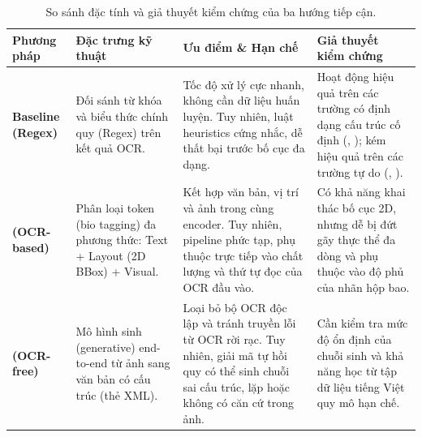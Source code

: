 \begin{table}[htbp]
  \centering
  \caption{So sánh đặc tính và giả thuyết kiểm chứng của ba hướng tiếp cận.}
  \label{tab:method-comparison}
  \small
  \begin{tabularx}{\textwidth}{p{2.3cm} p{2.4cm} L{3.2cm} X}
    \toprule
    \textbf{Phương pháp} & \textbf{Đặc trưng kỹ thuật} & \textbf{Ưu điểm \& Hạn chế} & \textbf{Giả thuyết kiểm chứng} \\
    \midrule
    \textbf{Baseline (Regex)} 
      & Đối sánh từ khóa và biểu thức chính quy (Regex) trên kết quả OCR. 
      & Tốc độ xử lý cực nhanh, không cần dữ liệu huấn luyện. Tuy nhiên, luật heuristics cứng nhắc, dễ thất bại trước bố cục đa dạng.
      & Hoạt động hiệu quả trên các trường có định dạng cấu trúc cố định (, ); kém hiệu quả trên các trường tự do (, ). \\
    \addlinespace
    \textbf{ (OCR-based)}
      & Phân loại token (\gls{bio} tagging) đa phương thức: Text + Layout (2D BBox) + Visual.
      & Kết hợp văn bản, vị trí và ảnh trong cùng encoder. Tuy nhiên, pipeline phức tạp, phụ thuộc trực tiếp vào chất lượng và thứ tự đọc của OCR đầu vào.
      & Có khả năng khai thác bố cục 2D, nhưng dễ bị đứt gãy thực thể đa dòng và phụ thuộc vào độ phủ của nhãn hộp bao. \\
    \addlinespace
    \textbf{ (OCR-free)}
      & Mô hình sinh (generative) end-to-end từ ảnh sang văn bản có cấu trúc (thẻ XML).
      & Loại bỏ bộ OCR độc lập và tránh truyền lỗi từ OCR rời rạc. Tuy nhiên, giải mã tự hồi quy có thể sinh chuỗi sai cấu trúc, lặp hoặc không có căn cứ trong ảnh.
      & Cần kiểm tra mức độ ổn định của chuỗi sinh và khả năng học từ tập dữ liệu tiếng Việt quy mô hạn chế. \\
    \bottomrule
  \end{tabularx}
\end{table}

